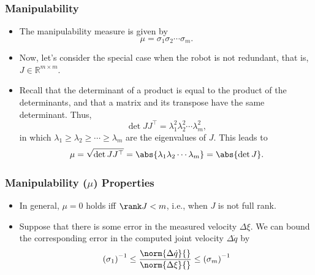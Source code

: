 \begin{frame}
    \frametitle{Manipulability}
    
    \begin{itemize}
        \item The manipulability measure is given by \[ \mu =
        \sigma_1\sigma_2\cdots\sigma_m. \]
        \item Now, let's consider the special case when the robot is not
        redundant, that is, $J \in \mathbb{R}^{m \times m}$.
        \item Recall that the determinant of a product is equal to the product
        of the determinants, and that a matrix and its transpose have the same
        determinant. Thus, \[ \det JJ^\top = \lambda_1^2 \lambda_2^2 \cdots
        \lambda_m^2, \] in which $\lambda_1 \geq \lambda_2 \geq \cdots \geq
        \lambda_m$ are the eigenvalues of $J$. This leads to
        \[ \mu = \sqrt{\det JJ^\top} = \abs{\lambda_1 \lambda_2 \cdots \lambda_m} = \abs{\det J}. \]
    \end{itemize}
\end{frame}


\begin{frame}
    \frametitle{Manipulability ($\mu$) Properties}

    \begin{itemize}
        \item In general, $\mu = 0$ holds iff $\rank J < m$, i.e., when $J$ is
        not full rank.
        \item Suppose that there is some error in the measured velocity $\Delta
        \xi$. We can bound the corresponding error in the computed joint
        velocity $\Delta \dot{q}$ by \[ \left( \sigma_1 \right)^{-1} \leq
        \frac{\norm{\Delta \dot{q}}{}}{\norm{\Delta \xi}{}} \leq \left( \sigma_m
        \right)^{-1} \]
    \end{itemize}
\end{frame}


